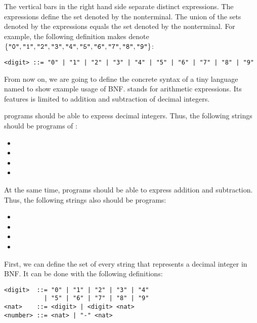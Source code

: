 The vertical bars in the right hand side separate distinct expressions.
The expressions define the set denoted by the nonterminal. The union of the sets
denoted by the expressions equals the set denoted by the nonterminal. For
example, the following definition makes  denote
$\{\texttt{"0"},\texttt{"1"},\texttt{"2"},\texttt{"3"},\texttt{"4"},\texttt{"5"},\texttt{"6"},\texttt{"7"},\texttt{"8"},\texttt{"9"}\}$:

\begin{verbatim}
<digit> ::= "0" | "1" | "2" | "3" | "4" | "5" | "6" | "7" | "8" | "9"
\end{verbatim}

From now on, we are going to define the concrete syntax of a tiny language named
\Lang to show example usage of BNF. \Lang stands for arithmetic expressions. Its
features is limited to addition and subtraction of decimal integers.

\Lang programs should be able to express decimal integers. Thus, the
following strings should be programs of \Lang:

\begin{itemize}
  \item {}
  \item {}
  \item {}
  \item {}
\end{itemize}

At the same time, programs should be able to express addition and subtraction.
Thus, the following strings also should be programs:

\begin{itemize}
  \item {}
  \item {}
  \item {}
  \item {}
\end{itemize}

First, we can define the set of every string that represents a decimal integer
in BNF. It can be done with the following definitions:

\begin{verbatim}
<digit>  ::= "0" | "1" | "2" | "3" | "4"
           | "5" | "6" | "7" | "8" | "9"
<nat>    ::= <digit> | <digit> <nat>
<number> ::= <nat> | "-" <nat>
\end{verbatim}

